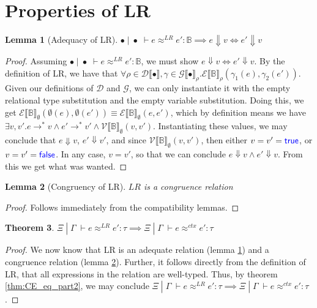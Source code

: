 \documentclass[twoside,11pt,openright]{report}
\newtheorem{theorem}{Theorem}
\newtheorem{lemma}[theorem]{Lemma}
\theoremstyle{definition}
\newcommand{\Keyword}[1]{{\color{blue} \mathsf{#1}}}
\newcommand{\expr}{e}
\newcommand{\val}{v}
\newcommand{\True}{\Keyword{true}}
\newcommand{\False}{\Keyword{false}}
\newcommand{\Tbool}{\mathbb{B}}
\newcommand{\typ}{\tau}
\newcommand{\venv}{\Gamma}
\newcommand{\tenv}{\Xi}
\newcommand{\emptenv}{\bullet}
\newcommand{\empvenv}{\bullet}
\newcommand{\jdgRel}[6]{#1 \; | \; #2 \; \vdash #3 \approx^{#4} #5 : #6}
\newcommand{\ctxRel}[5]{\jdgRel{#1}{#2}{#3}{ctx}{#4}{#5}}
\newcommand{\stepS}{\rightarrow^*}
\newcommand{\ValInp}[2]{\mathcal{V} \llbracket #1 \rrbracket_{#2}}
\newcommand{\ExpInp}[2]{\mathcal{E} \llbracket #1 \rrbracket_{#2}}
\newcommand{\VenvInp}[2]{\mathcal{G} \llbracket #1 \rrbracket_{#2}}
\newcommand{\TenvInp}[1]{\mathcal{D} \llbracket #1 \rrbracket}
\newcommand{\LogRel}[5]{\jdgRel{#1}{#2}{#3}{LR}{#4}{#5}}
\begin{document}
\section{Properties of LR}

\begin{lemma}[Adequacy of LR]\label{lem:LR_adeq}
  $\LogRel{\emptenv}{\empvenv}{\expr}{\expr'}{\Tbool} \implies \expr \Downarrow \val \iff \expr' \Downarrow \val$
\end{lemma}
\begin{proof}
  Assuming $\LogRel{\emptenv}{\empvenv}{\expr}{\expr'}{\Tbool}$, we must show 
  $\expr \Downarrow \val \iff \expr' \Downarrow \val$. By the definition of LR, we have that $\forall \rho \in \TenvInp{\emptenv}, \gamma \in \VenvInp{\empvenv}{\rho} . \ExpInp{\Tbool}{\rho}(\gamma_1(\expr), \gamma_2(\expr'))$. Given our definitions of $\mathcal{D}$ and $\mathcal{G}$, we can only instantiate it with the empty relational type substitution and the empty variable substitution. Doing this, we get $\ExpInp{\Tbool}{\emptyset}(\emptyset(\expr), \emptyset(\expr')) \equiv \ExpInp{\Tbool}{\emptyset}(\expr, \expr')$, which by definition means we have $\exists \val, \val' . \expr \stepS \val \land \expr' \stepS \val' \land \ValInp{\Tbool}{\emptyset}(\val, \val')$. Instantiating these values, we may conclude that $\expr \Downarrow \val$, $\expr' \Downarrow \val'$, and since $\ValInp{\Tbool}{\emptyset}(\val, \val')$, then either $\val = \val' = \True$, or $\val = \val' = \False$. In any case, $\val = \val'$, so that we can conclude $\expr \Downarrow \val \land \expr' \Downarrow \val$. From this we get what was wanted.
\end{proof}

\begin{lemma}[Congruency of LR]\label{lem:LR_cong}
  $LR$ is a congruence relation
\end{lemma}
\begin{proof}
  Follows immediately from the compatibility lemmas.
\end{proof}

\begin{theorem}
  $\LogRel{\tenv}{\venv}{\expr}{\expr'}{\typ} \implies \ctxRel{\tenv}{\venv}{\expr}{\expr'}{\typ}$
\end{theorem}
\begin{proof}
  We now know that LR is an adequate relation (lemma \ref{lem:LR_adeq}) and a congruence relation (lemma \ref{lem:LR_cong}). Further, it follows directly from the definition of LR, that all expressions in the relation are well-typed. Thus, by theorem \ref{thm:CE_eq_part2}, we may conclude $\LogRel{\tenv}{\venv}{\expr}{\expr'}{\typ} \implies \ctxRel{\tenv}{\venv}{\expr}{\expr'}{\typ}$.
\end{proof}
\end{document}
